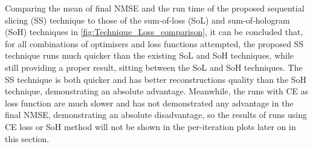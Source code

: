 Comparing the mean of final NMSE and the run time of the proposed sequential slicing (SS) technique to those of the sum-of-loss (SoL) and sum-of-hologram (SoH) techniques in \cref{fig:Technique_Loss_comparison}, it can be concluded that, for all combinations of optimisers and loss functions attempted, the proposed SS technique runs much quicker than the existing SoL and SoH techniques, while still providing a proper result, sitting between the SoL and SoH techniques. The SS technique is both quicker and has better reconstructions quality than the SoH technique, demonstrating an absolute advantage. Meanwhile, the runs with CE as loss function are much slower and has not demonstrated any advantage in the final NMSE, demonstrating an absolute disadvantage, so the results of runs using CE loss or SoH method will not be shown in the per-iteration plots later on in this section.

